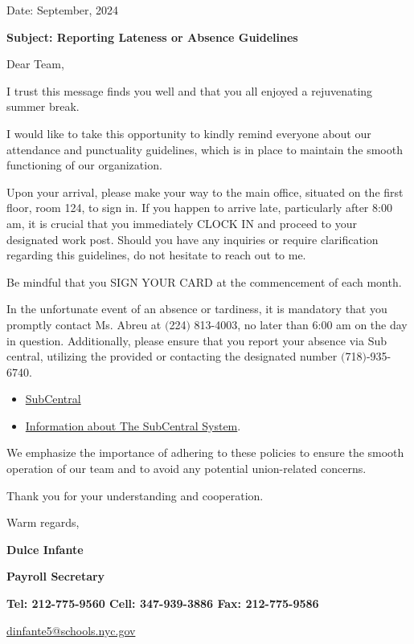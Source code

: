 \documentclass[11pt,letterpaper]{article}
\author{Hilduara Abreu}
\begin{document}
\vspace*{0.5in}
Date: September, 2024 

\textbf{Subject: Reporting Lateness or Absence Guidelines}

Dear Team,

I trust this message finds you well and that you all enjoyed a rejuvenating summer break.

I would like to take this opportunity to kindly remind everyone about our attendance and punctuality guidelines, which is in place to maintain the smooth functioning of our organization.

Upon your arrival, please make your way to the main office, situated on the first floor, room 124, to sign in. If you happen to arrive late, particularly after 8:00 am, it is crucial that you immediately CLOCK IN and proceed to your designated work post. Should you have any inquiries or require clarification 
regarding this guidelines, do not hesitate to reach out to me. 

Be mindful that you SIGN YOUR CARD at the commencement of each month.

In the unfortunate event of an absence or tardiness, it is mandatory that you promptly contact Ms. Abreu at $($224$)$ 813-4003, no later than 6:00 am on the day in question. Additionally, please ensure that you report your absence via Sub central, utilizing the provided or contacting the designated number $($718$)$-935-6740. 
\begin{itemize}
\item \href{https://subcentral.eschoolsolutions.com/logOnInitAction.do}{SubCentral}
\item \href {https://video.eschoolsolutions.com/udocs/NYCEmployeesWEBCAST2.0.pdf}{
Information about The SubCentral System}.
\end{itemize}
We emphasize the importance of adhering to these policies to ensure the smooth operation of our team and to avoid any potential union-related concerns.

Thank you for your understanding and cooperation.

Warm regards,

\begin{small}
\textbf{Dulce Infante}

\textbf{Payroll Secretary}

\textbf{Tel: 212-775-9560 Cell: 347-939-3886 Fax: 212-775-9586}

\href{mailto:dinfante5@schools.nyc.gov}{dinfante5@schools.nyc.gov}

\end{small}
\end{document}
